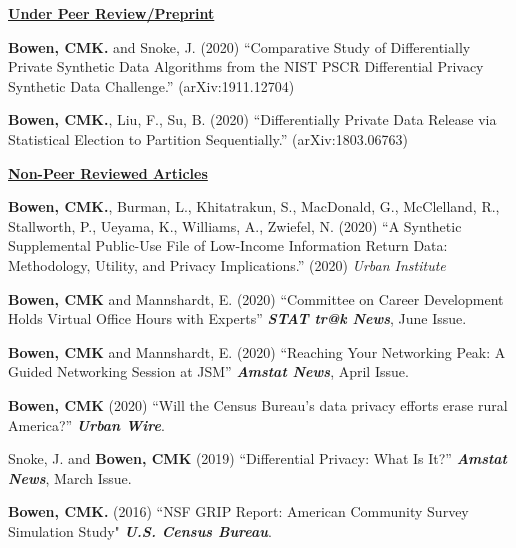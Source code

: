 \documentclass[11pt, letterpaper, roman]{moderncv} %
\begin{document}
\begin{etaremune}[topsep=0pt, itemsep=3pt, partopsep=0pt, parsep=0pt]
\vspace{4pt}
\hspace{-0.30in}\noindent\underline{\textbf{Under Peer Review/Preprint}}
    \item \textbf{Bowen, CMK.} and Snoke, J. (2020) ``Comparative Study of Differentially Private Synthetic Data Algorithms from the NIST PSCR Differential Privacy Synthetic Data Challenge.''
    (arXiv:1911.12704)

    \item \textbf{Bowen, CMK.}, Liu, F., Su, B. (2020) ``Differentially Private Data Release via Statistical Election to Partition Sequentially.''
    (arXiv:1803.06763)
\end{etaremune}

\vspace{4pt}
\noindent\underline{\textbf{Non-Peer Reviewed Articles}}

\vspace{4pt}
\begin{etaremune}[topsep=0pt, itemsep=4pt, partopsep=0pt, parsep=0pt]
    \item \textbf{Bowen, CMK.}, Burman, L., Khitatrakun, S., MacDonald, G., McClelland, R., Stallworth, P., Ueyama, K., Williams, A., Zwiefel, N. (2020) ``A Synthetic Supplemental Public-Use File of Low-Income Information Return Data: Methodology, Utility, and Privacy Implications.'' (2020) \textit{Urban Institute}

    \item \textbf{Bowen, CMK} and Mannshardt, E. (2020) ``Committee on Career Development Holds Virtual Office Hours with Experts'' \textbf{\textit{STAT tr@k News}}, June Issue.

    \item \textbf{Bowen, CMK} and Mannshardt, E. (2020) ``Reaching Your Networking Peak: A Guided Networking Session at JSM'' \textbf{\textit{Amstat News}}, April Issue.
    
    \item \textbf{Bowen, CMK} (2020) ``Will the Census Bureau's data privacy efforts erase rural America?'' \textbf{\textit{Urban Wire}}. 
    
    \item Snoke, J. and \textbf{Bowen, CMK} (2019) ``Differential Privacy: What Is It?'' \textbf{\textit{Amstat News}}, March Issue.
    
    \item \textbf{Bowen, CMK.} (2016) ``NSF GRIP Report: American Community Survey Simulation Study" \textbf{\textit{U.S. Census Bureau}}.  
\end{etaremune}
\end{document}
